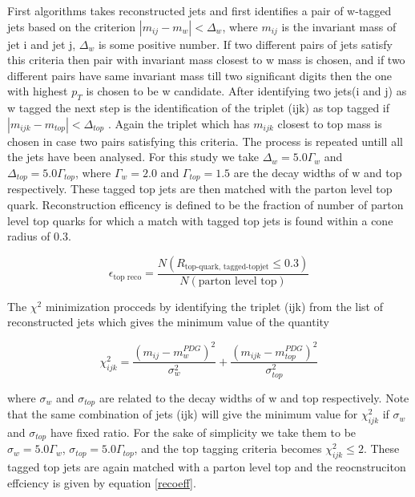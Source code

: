 \documentclass[12pt,a4paper]{article}		%
\begin{document}
	 First algorithms takes reconstructed jets and first identifies a pair of w-tagged jets based on the criterion
	 $| m_{ij} - m_w | < \Delta_w$, where $m_{ij}$ is the invariant mass of jet i and jet j, $\Delta_w$ is some positive number. If two different pairs of jets satisfy this criteria then pair with invariant mass closest to w mass is chosen, and if two different pairs have same invariant mass till two significant digits then the one with highest $p_T$ is chosen to be w candidate. After identifying two jets(i and j) as w tagged the next step is the identification of the triplet (ijk) as top tagged if $|m_{ijk} -  m_{top}| < \Delta_{top}$ . Again the triplet which has $m_{ijk}$ closest to top mass is chosen in case two pairs satisfying this criteria. The process is repeated untill all the jets have been analysed. For this study we take $\Delta_w = 5.0\Gamma_w$ and $\Delta_{top} = 5.0\Gamma_{top}$, where $\Gamma_w = 2.0$ \cite{pdg-w} and $\Gamma_{top} = 1.5$\cite{pdg-top} are the decay widths of w and top respectively. These tagged top jets are then matched with the parton level top quark. Reconstruction efficency is defined to be the fraction of number of parton level top quarks for which a match with tagged top jets  is found within a cone radius of 0.3. 
	 
	 \begin{equation}
	 \epsilon_{\text{top reco}} = \frac{N(R_{ \text{top-quark,  tagged-topjet}} \le 0.3 )}{N( \text{parton level top})}
	 \label{recoeff}	
	 \end{equation}
	 
The $\chi^2$ minimization procceds by identifying the triplet (ijk) from the list of reconstructed jets which gives the minimum value of the quantity  

	\begin{equation}
		\chi_{ijk}^2 = \frac{ \left(m_{ij} - m_{w}^{PDG} \right)^2 }{ \sigma_w^2}	+  \frac{ \left(m_{ijk} - m_{top}^{PDG} \right)^2 }{ \sigma_{top}^2}
		\label{chisq}
	\end{equation}

where $\sigma_w$ and $\sigma_{top}$ are related to the decay widths of w and top respectively. Note that the same combination of jets (ijk)  will give the minimum value for $\chi_{ijk}^2$ if $\sigma_w$ and $\sigma_{top}$ have fixed ratio. For the sake of simplicity we take them to be $\sigma_w = 5.0\Gamma_w$, $\sigma_{top} = 5.0\Gamma_{top}$, and the top tagging criteria becomes $\chi_{ijk}^2 \le 2$. These tagged top jets are again matched with a parton level top and the reocnstruciton effciency is given by equation \ref{recoeff}. 
\end{document}
